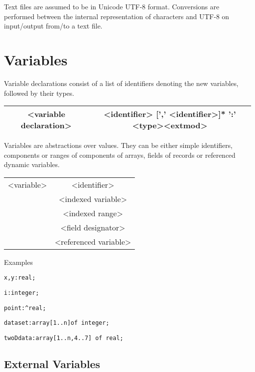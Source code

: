 {Text files are assumed to be in Unicode UTF-8 format. Conversions are performed between
the internal representation of characters and UTF-8 on input/output from/to a text file.

\section{Variables}

Variable declarations consist of a list of identifiers denoting the new variables,
followed by their types.

\vspace{0.3cm}
{\centering \begin{tabular}{|c|c|}
\hline 
<variable declaration>&
<identifier> {[}',' <identifier>{]}{*} ':' <type><extmod>\\
\hline 
\end{tabular}\par}
\vspace{0.3cm}

Variables are abstractions over values. They can be either simple identifiers,
components or ranges of components of arrays, fields of records or referenced
dynamic variables.

\vspace{0.3cm}
{\centering \begin{tabular}{|c|c|}
\hline 
<variable>&
<identifier>\\
&
<indexed variable>\\
&
<indexed range>\\
&
<field designator>\\
&
<referenced variable>\\
\hline 
\end{tabular}\par}
\vspace{0.3cm}

Examples

\texttt{x,y:real;}

\texttt{i:integer;}

\texttt{point:\textasciicircum{}real;}

\texttt{dataset:array{[}1..n{]}of integer;}

\texttt{twoDdata:array{[}1..n,4..7{]} of real;}


\subsection{External Variables}

}

